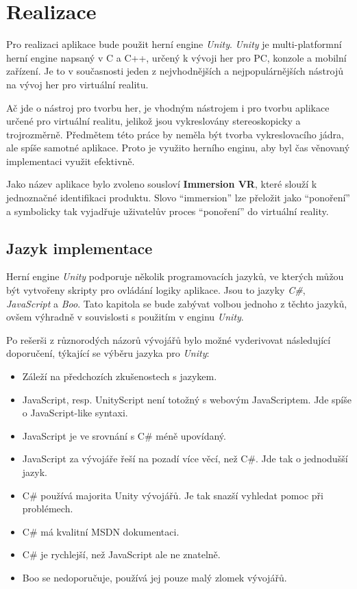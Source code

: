 \chapter{Realizace}\label{realizace}

Pro realizaci aplikace bude použit herní engine \emph{Unity}.
\emph{Unity} je multi-platformní herní engine napsaný v C a C++, určený
k vývoji her pro PC, konzole a mobilní zařízení. Je to v současnosti
jeden z nejvhodnějších a nejpopulárnějších nástrojů na vývoj her pro
virtuální realitu. \autocite{unitypopularity}

Ač jde o nástroj pro tvorbu her, je vhodným nástrojem i pro tvorbu
aplikace určené pro virtuální realitu, jelikož jsou vykreslovány 
stereoskopicky a trojrozměrně. Předmětem této práce by neměla 
být tvorba vykreslovacího jádra, ale spíše samotné aplikace. 
Proto je využito herního enginu, aby byl čas
věnovaný implementaci využit efektivně.

Jako název aplikace bylo zvoleno sousloví \textbf{Immersion VR}, které
slouží k jednoznačné identifikaci produktu. Slovo ``immersion'' lze
přeložit jako ``ponoření'' a symbolicky tak vyjadřuje uživatelův proces
``ponoření'' do virtuální reality.

\section{Jazyk implementace}\label{jazyk-implementace}

Herní engine \emph{Unity} podporuje několik programovacích jazyků, ve
kterých můžou být vytvořeny skripty pro ovládání logiky aplikace. Jsou
to jazyky \emph{C\#}, \emph{JavaScript} a \emph{Boo}. \autocite{unitylanguages} Tato kapitola se
bude zabývat volbou jednoho z těchto jazyků, ovšem výhradně v
souvislosti s použitím v enginu \emph{Unity}.

Po rešerši z různorodých názorů vývojářů bylo možné vyderivovat
následující doporučení, týkající se výběru jazyka pro \emph{Unity}: \autocite{languagesresearch}

\begin{itemize}
\tightlist
\item
  Záleží na předchozích zkušenostech s jazykem.
\item
  JavaScript, resp. UnityScript není totožný s webovým JavaScriptem. Jde
  spíše o JavaScript-like syntaxi.
\item
  JavaScript je ve srovnání s C\# méně upovídaný.
\item
  JavaScript za vývojáře řeší na pozadí více věcí, než C\#. Jde tak o
  jednodušší jazyk.
\item
  C\# používá majorita Unity vývojářů. Je tak snazší vyhledat pomoc při
  problémech.
\item
  C\# má kvalitní MSDN dokumentaci.
\item
  C\# je rychlejší, než JavaScript ale ne znatelně.
\item
  Boo se nedoporučuje, používá jej pouze malý zlomek vývojářů.
\end{itemize}

